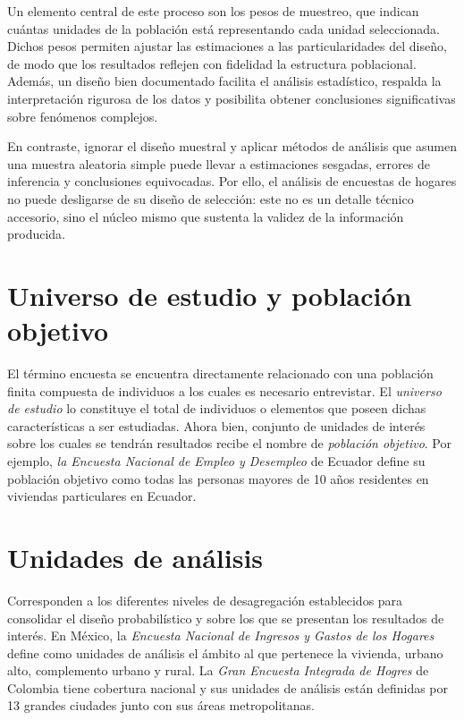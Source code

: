 \documentclass[
  12pt,
]{book}
\begin{document}
Un elemento central de este proceso son los pesos de muestreo, que indican cuántas unidades de la población está representando cada unidad seleccionada. Dichos pesos permiten ajustar las estimaciones a las particularidades del diseño, de modo que los resultados reflejen con fidelidad la estructura poblacional. Además, un diseño bien documentado facilita el análisis estadístico, respalda la interpretación rigurosa de los datos y posibilita obtener conclusiones significativas sobre fenómenos complejos.

En contraste, ignorar el diseño muestral y aplicar métodos de análisis que asumen una muestra aleatoria simple puede llevar a estimaciones sesgadas, errores de inferencia y conclusiones equivocadas. Por ello, el análisis de encuestas de hogares no puede desligarse de su diseño de selección: este no es un detalle técnico accesorio, sino el núcleo mismo que sustenta la validez de la información producida.

\section{Universo de estudio y población objetivo}\label{universo-de-estudio-y-poblaciuxf3n-objetivo}

El término encuesta se encuentra directamente relacionado con una población finita compuesta de individuos a los cuales es necesario entrevistar. El \emph{universo de estudio} lo constituye el total de individuos o elementos que poseen dichas características a ser estudiadas. Ahora bien, conjunto de unidades de interés sobre los cuales se tendrán resultados recibe el nombre de \emph{población objetivo}. Por ejemplo, \emph{la Encuesta Nacional de Empleo y Desempleo} de Ecuador define su población objetivo como todas las personas mayores de 10 años residentes en viviendas particulares en Ecuador.

\section{Unidades de análisis}\label{unidades-de-anuxe1lisis}

Corresponden a los diferentes niveles de desagregación establecidos para consolidar el diseño probabilístico y sobre los que se presentan los resultados de interés. En México, la \emph{Encuesta Nacional de Ingresos y Gastos de los Hogares} define como unidades de análisis el ámbito al que pertenece la vivienda, urbano alto, complemento urbano y rural. La \emph{Gran Encuesta Integrada de Hogres} de Colombia tiene cobertura nacional y sus unidades de análisis están definidas por 13 grandes ciudades junto con sus áreas metropolitanas.
\end{document}
